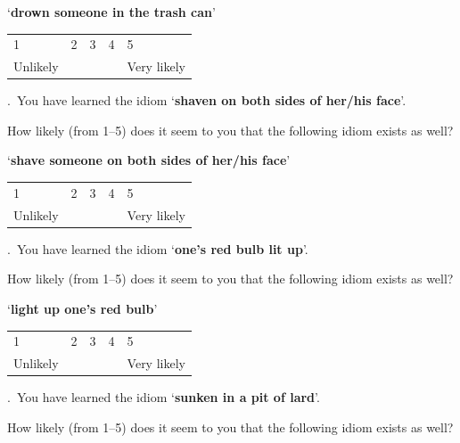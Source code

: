 \documentclass[output=paper]{langsci/langscibook}
\begin{document}
\begin{subappendices}
{\noindent \enquote*{\textbf{drown someone in the trash can}}\vspace{.5\baselineskip}

\noindent \begin{tabularx}{\textwidth}{XXXXX}
        1 & 2 & 3 & 4 & 5\\
        Unlikely & & & & Very likely\\
        \end{tabularx}\vspace{1\baselineskip}


.\ You have learned the idiom \enquote*{\textbf{shaven on both sides of
    her/his face}}.

\noindent How likely (from 1--5) does it seem to you that the following idiom exists
    as well?\vspace{.5\baselineskip}

\noindent \enquote*{\textbf{shave someone on both sides of her/his face}}\vspace{.5\baselineskip}

\noindent \begin{tabularx}{\textwidth}{XXXXX}
        1 & 2 & 3 & 4 & 5\\
        Unlikely & & & & Very likely\\
        \end{tabularx}\vspace{1\baselineskip}

.\ You have learned the idiom \enquote*{\textbf{one's red bulb lit up}}.


\noindent How likely (from 1--5) does it seem to you that the following idiom exists
    as well?\vspace{.5\baselineskip}

\noindent \enquote*{\textbf{light up one's red bulb}}\vspace{.5\baselineskip}

\noindent \begin{tabularx}{\textwidth}{XXXXX}
        1 & 2 & 3 & 4 & 5\\
        Unlikely & & & & Very likely\\
        \end{tabularx}\vspace{1\baselineskip}

.\ You have learned the idiom \enquote*{\textbf{sunken in a pit of lard}}.

\noindent How likely (from 1--5) does it seem to you that the following idiom exists
    as well?\vspace{.5\baselineskip}

}
\end{subappendices}
\end{document}
